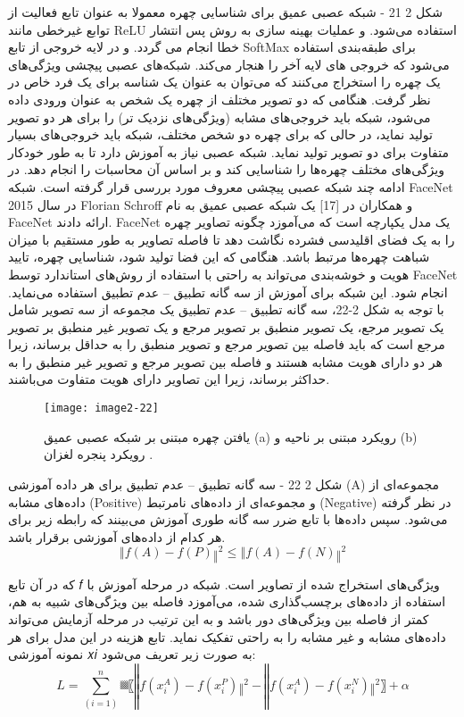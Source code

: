 شکل ‏2 21 - شبکه عصبی عمیق برای شناسایی چهره
معمولا به عنوان تابع فعالیت از توابع غیرخطی مانند ReLU  استفاده می‌شود. و عملیات بهینه سازی به روش پس انتشار خطا انجام می گردد. و در لایه خروجی از تابع SoftMax برای طبقه‌بندی استفاده می‌شود که خروجی های لایه آخر را هنجار می‌کند. شبکه‌های عصبی پیچشی ویژگی‌های یک چهره را استخراج می‌کنند که می‌توان به عنوان یک شناسه برای یک فرد خاص در نظر گرفت. هنگامی که دو تصویر مختلف از چهره یک شخص به عنوان ورودی داده می‌شود، شبکه باید خروجی‌های مشابه (ویژگی‌های نزدیک تر) را برای هر دو تصویر تولید نماید، در حالی که برای چهره دو شخص مختلف، شبکه باید خروجی‌های بسیار متفاوت برای دو تصویر تولید نماید. شبکه عصبی نیاز به آموزش دارد تا به طور خودکار ویژگی‌های مختلف چهره‌ها را شناسایی کند و بر اساس آن محاسبات را انجام دهد. در ادامه چند شبکه عصبی پیچشی معروف مورد بررسی قرار گرفته است.
	شبکه FaceNet
در سال 2015 Florian Schroff و همکاران در [17] یک شبکه عصبی عمیق به نام FaceNet ارائه دادند. FaceNet یک مدل یکپارچه است که می‌آموزد چگونه تصاویر چهره را به یک فضای اقلیدسی فشرده نگاشت دهد تا فاصله تصاویر به طور مستقیم با میزان شباهت چهره‌ها مرتبط باشد. هنگامی که این فضا تولید شود، شناسایی چهره، تایید هویت و خوشه‌بندی می‌تواند به راحتی با استفاده از روش‌های استاندارد توسط FaceNet انجام شود. این شبکه برای آموزش از سه گانه تطبیق – عدم تطبیق استفاده می‌نماید. با توجه به شکل 2-22، سه گانه تطبیق – عدم تطبیق یک مجموعه از سه تصویر شامل یک تصویر مرجع، یک تصویر منطبق بر تصویر مرجع و یک تصویر غیر منطبق بر تصویر مرجع است که باید فاصله بین تصویر مرجع و تصویر منطبق را به حداقل برساند، زیرا هر دو دارای هویت مشابه هستند و فاصله بین تصویر مرجع و تصویر غیر منطبق را به حداکثر برساند، زیرا این تصاویر دارای هویت متفاوت می‌باشند. 
 
 \begin{figure}[h]
\centering
  \texttt{[image: image2-22]}
  \caption{یافتن چهره مبتنی بر شبکه عصبی عمیق (a) رویکرد مبتنی بر ناحیه و (b) رویکرد پنجره لغزان \cite{ref1}.}
  \label{image2-22}
\end{figure}

شکل ‏2 22 - سه گانه تطبیق – عدم تطبیق
برای هر داده آموزشی (A) مجموعه‌ای از داده‌های مشابه (Positive) و مجموعه‌ای از داده‌های نامرتبط (Negative) در نظر گرفته می‌شود. سپس داده‌ها با تابع ضرر سه گانه طوری آموزش می‌بینند که رابطه زیر برای هر کدام از داده‌های آموزشی برقرار باشد.
\begin{equation}\label{eq2-10}
‖f(A)-f(P)‖^2≤‖f(A)-f(N)‖^2	
\end{equation}

که در آن تابع 𝑓 ویژگی‌های استخراج شده از تصاویر است. شبكه در مرحله آموزش با استفاده از داده‌های برچسب‌گذاری شده، می‌آموزد فاصله بین ویژگی‌های شبیه به هم، کمتر از فاصله بین ویژگی‌های دور باشد و به این ترتیب در مرحله آزمایش می‌تواند داده‌های مشابه و غیر مشابه را به راحتی تفكیک نماید. تابع هزینه در این مدل برای هر نمونه آموزشی 𝑥𝑖  به صورت زیر تعریف می‌شود:
\begin{equation}\label{eq2-11}
L=∑_(i=1)^n▒〖‖f(x_i^A )-f(x_i^P)‖^2-‖f(x_i^A )-f(x_i^N)‖^2 〗+α	
\end{equation}
		
